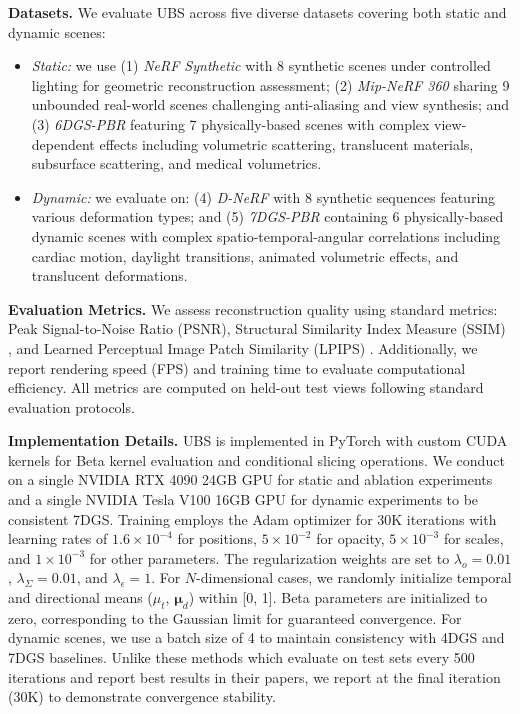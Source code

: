 \documentclass{article} %
\begin{document}
\textbf{Datasets.}
We evaluate UBS across five diverse datasets covering both static and dynamic scenes:
\begin{itemize}[left=0pt, labelsep=0.5em, noitemsep, topsep=0pt, partopsep=0pt, parsep=0pt]
    \item \textit{Static:} we use (1) \textit{NeRF Synthetic} \citep{mildenhall2021nerf} with 8 synthetic scenes under controlled lighting for geometric reconstruction assessment; (2) \textit{Mip-NeRF 360} \citep{barron2021mipnerf} sharing 9 unbounded real-world scenes challenging anti-aliasing and view synthesis; and (3) \textit{6DGS-PBR} \citep{gao20246dgs} featuring 7 physically-based scenes with complex view-dependent effects including volumetric scattering, translucent materials, subsurface scattering, and medical volumetrics.
    
    \item \textit{Dynamic:} we evaluate on: (4) \textit{D-NeRF} \citep{pumarola2020dnerfneuralradiancefields} with 8 synthetic sequences featuring various deformation types; and (5) \textit{7DGS-PBR} \citep{gao20257dgs} containing 6 physically-based dynamic scenes with complex spatio-temporal-angular correlations including cardiac motion, daylight transitions, animated volumetric effects, and translucent deformations.
\end{itemize}

\textbf{Evaluation Metrics.}
We assess reconstruction quality using standard metrics: Peak Signal-to-Noise Ratio (PSNR), Structural Similarity Index Measure (SSIM) \citep{wang2004image}, and Learned Perceptual Image Patch Similarity (LPIPS) \citep{zhang2018perceptual}. Additionally, we report rendering speed (FPS) and training time to evaluate computational efficiency. All metrics are computed on held-out test views following standard evaluation protocols.

\textbf{Implementation Details.}
UBS is implemented in PyTorch with custom CUDA kernels for Beta kernel evaluation and conditional slicing operations. We conduct on a single NVIDIA RTX 4090 24GB GPU for static and ablation experiments and a single NVIDIA Tesla V100 16GB GPU for dynamic experiments to be consistent 7DGS. Training employs the Adam optimizer for 30K iterations with learning rates of $1.6 \times 10^{-4}$ for positions, $5 \times 10^{-2}$ for opacity, $5 \times 10^{-3}$ for scales, and $1 \times 10^{-3}$ for other parameters. The regularization weights are set to $\lambda_o = 0.01$, $\lambda_\Sigma=0.01$, and $\lambda_\epsilon=1$. For $N$-dimensional cases, we randomly initialize temporal and directional means ($\mu_t$, $\bm{\mu}_d$) within [0, 1]. Beta parameters are initialized to zero, corresponding to the Gaussian limit for guaranteed convergence. For dynamic scenes, we use a batch size of 4 to maintain consistency with 4DGS and 7DGS baselines. Unlike these methods which evaluate on test sets every 500 iterations and report best results in their papers, we report at the final iteration (30K) to demonstrate convergence stability.
\end{document}

